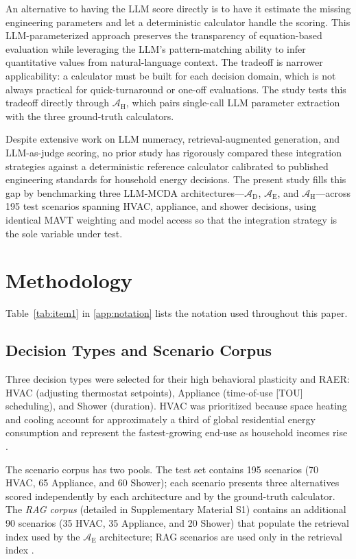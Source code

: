 \documentclass[a4paper,fleqn]{cas-dc}
\begin{document}
An alternative to having the LLM score directly is to have it estimate the missing engineering parameters and let a deterministic calculator handle the scoring. This LLM-parameterized approach preserves the transparency of equation-based evaluation while leveraging the LLM's pattern-matching ability to infer quantitative values from natural-language context. The tradeoff is narrower applicability: a calculator must be built for each decision domain, which is not always practical for quick-turnaround or one-off evaluations. The study tests this tradeoff directly through $\mathcal{A}_{\text{H}}$, which pairs single-call LLM parameter extraction with the three ground-truth calculators.

Despite extensive work on LLM numeracy, retrieval-augmented generation, and LLM-as-judge scoring, no prior study has rigorously compared these integration strategies against a deterministic reference calculator calibrated to published engineering standards for household energy decisions. The present study fills this gap by benchmarking three LLM-MCDA architectures---$\mathcal{A}_{\text{D}}$, $\mathcal{A}_{\text{E}}$, and $\mathcal{A}_{\text{H}}$---across 195 test scenarios spanning HVAC, appliance, and shower decisions, using identical MAVT weighting and model access so that the integration strategy is the sole variable under test.

\section{Methodology}
\label{sec2}

Table~\ref{tab:item1} in \ref{app:notation} lists the notation used throughout this paper.

\subsection{Decision Types and Scenario Corpus}
Three decision types were selected for their high behavioral plasticity and RAER: HVAC (adjusting thermostat setpoints), Appliance (time-of-use [TOU] scheduling), and Shower (duration). HVAC was prioritized because space heating and cooling account for approximately a third of global residential energy consumption and represent the fastest-growing end-use as household incomes rise \citep{GONZALEZTORRES2022112428}.

The scenario corpus has two pools. The test set contains 195 scenarios (70 HVAC, 65 Appliance, and 60 Shower); each scenario presents three alternatives scored independently by each architecture and by the ground-truth calculator. The \textit{RAG corpus} (detailed in Supplementary Material S1) contains an additional 90 scenarios (35 HVAC, 35 Appliance, and 20 Shower) that populate the retrieval index used by the $\mathcal{A}_{\text{E}}$ architecture; RAG scenarios are used only in the retrieval index \citep{lewis2020}.
\end{document}
